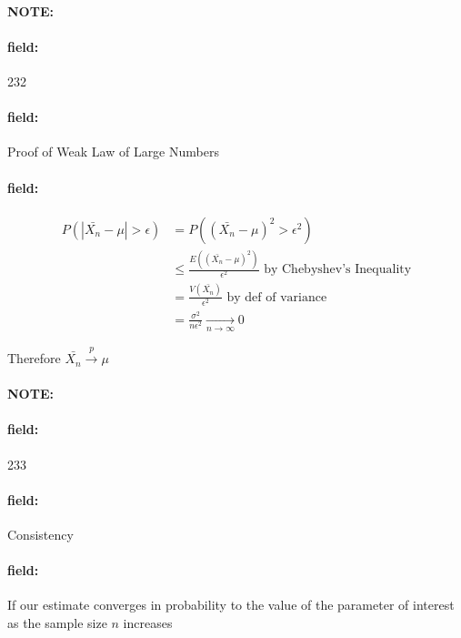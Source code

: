 \documentclass[12pt]{article}
\newenvironment{note}{\paragraph{NOTE:}}{}
\newenvironment{field}{\paragraph{field:}}{}
\begin{document}
\begin{note} \begin{field} \tiny 232 \end{field}
  \begin{field}
    Proof of Weak Law of Large Numbers
  \end{field}
  \begin{field}
    \begin{align*}
      P(|\bar{X_n} - \mu| > \epsilon ) &= P((\bar{X_n} - \mu)^2 > \epsilon^2)\\
      &\leq \frac{E((\bar{X_n} - \mu)^2)}{\epsilon^2} \text{ by Chebyshev's Inequality}\\
      &= \frac{V(\bar{X_n})}{\epsilon^2} \text{ by def of variance}\\
      &= \frac{\sigma^2}{n \epsilon^2} \underset{n \to \infty}{\to} 0
    \end{align*}

    Therefore $\bar{X_n} \overset{p}{\to} \mu$
  \end{field}
\end{note}



\begin{note} \begin{field} \tiny 233 \end{field}
  \begin{field}
    Consistency
  \end{field}
  \begin{field}
    If our estimate converges in probability to the value of the parameter of interest as the sample size $n$ increases
  \end{field}
\end{note}
\end{document}
